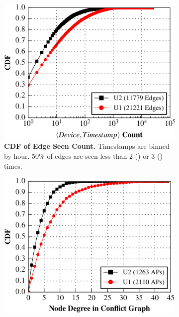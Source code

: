 \begin{figure}[t]
  \centering
  \begin{minipage}[b]{0.65\textwidth}
    \begin{subfigure}[t]{0.48\textwidth}
      \includegraphics[width=\columnwidth]{./figures/CampusConflictWeight.pdf}
      \caption{\textbf{CDF of Edge Seen Count.} Timestamps are binned by hour. 50\%
      of edges are seen less than 2 (\nd{}) or 3 (\ub{}) times.}
      \label{fig:campus_edge_weight}
    \end{subfigure}\hspace{0.02\textwidth}%
    \begin{subfigure}[t]{0.48\textwidth}
      \includegraphics[width=\columnwidth]{./figures/CampusConflictDegree.pdf}

\end{subfigure}
\end{minipage}
\end{figure}
